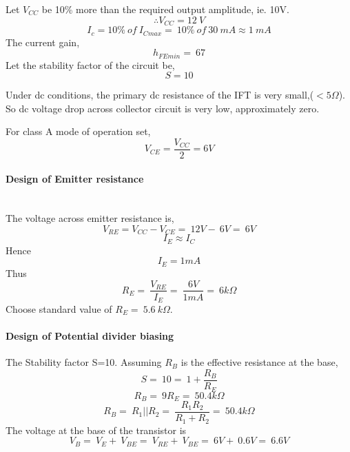 \noindent Let $V_{CC}$ be 10\% more than the required output amplitude, ie. 10V.
\begin{equation}
\therefore V_{CC}=12\ V
\end{equation}
\begin{equation}
I_c=10 \% \ of \  I_{Cmax} =\ 10\%\  of\  30\  mA \approx 1\ mA
\end{equation}
\noindent The current gain,
\begin{equation}
h_{FEmin}=\ 67
\end{equation}
Let the stability factor of the circuit be,
\begin{equation}
S=10
\end{equation}

\noindent Under dc  conditions, the primary dc resistance of the IFT is very small,($<5\Omega$). So dc voltage drop across collector circuit is very low, approximately zero.

\noindent For class A mode of operation set, 
\begin{equation}
 V_{CE} = \frac{V_{CC}}{2}= 6 V
\end{equation}
\paragraph{Design of Emitter resistance}
\noindent \\The voltage across emitter resistance is,
\begin{equation}
V_{RE}=V_{CC}- V_{CE} =\ 12V-\ 6V=\ 6V
\end{equation}
\begin{equation}
I_E \approx I_C 
 \end{equation}
\noindent Hence
\begin{equation}
I_E = 1mA
\end{equation}
\noindent Thus
\begin{equation}
R_E=\ \frac{V_{RE}}{I_E}=\ \frac{6V}{1mA}=\ 6k\Omega
\end{equation}
\noindent Choose standard value of $R_E=\ 5.6 \ k\Omega$.
\paragraph{Design of Potential divider biasing\\}
\noindent The Stability factor S=10. Assuming $R_B$ is the effective resistance at the base,
\begin{equation}
S=\ 10=\ 1+\frac{R_B}{R_E}
\end{equation}
\begin{equation}
R_B=\ 9R_E=\ 50.4k\Omega
\end{equation}
\begin{equation}
\label{R1R2}
R_B=\ R_1||R_2=\ \frac{R_1R_2}{R_1+R_2}=\ 50.4k\Omega
\end{equation}
\noindent The voltage at the base of the transistor is 
\begin{equation}
V_B=\ V_E+\ V_{BE}=\ V_{RE}+\ V_{BE}=\ 6V+\ 0.6V=\ 6.6 V
\end{equation}

